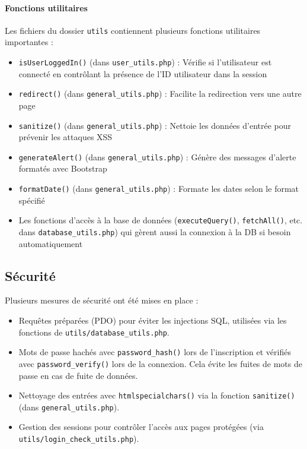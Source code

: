 \documentclass[a4paper,12pt]{article}
\begin{document}
\paragraph{Fonctions utilitaires}
Les fichiers du dossier \texttt{utils} contiennent plusieurs fonctions utilitaires importantes :
\begin{itemize}
    \item \texttt{isUserLoggedIn()} (dans \texttt{user\_utils.php}) : Vérifie si l'utilisateur est connecté en contrôlant la présence de l'ID utilisateur dans la session
    \item \texttt{redirect()} (dans \texttt{general\_utils.php}) : Facilite la redirection vers une autre page
    \item \texttt{sanitize()} (dans \texttt{general\_utils.php}) : Nettoie les données d'entrée pour prévenir les attaques XSS
    \item \texttt{generateAlert()} (dans \texttt{general\_utils.php}) : Génère des messages d'alerte formatés avec Bootstrap
    \item \texttt{formatDate()} (dans \texttt{general\_utils.php}) : Formate les dates selon le format spécifié
    \item Les fonctions d'accès à la base de données (\texttt{executeQuery()}, \texttt{fetchAll()}, etc. dans \texttt{database\_utils.php}) qui gèrent aussi la connexion à la DB si besoin automatiquement
\end{itemize}

\subsection{Sécurité}
Plusieurs mesures de sécurité ont été mises en place :
\begin{itemize}
    \item Requêtes préparées (PDO) pour éviter les injections SQL, utilisées via les fonctions de \texttt{utils/database\_utils.php}.
    \item Mots de passe hachés avec \texttt{password\_hash()} lors de l'inscription et vérifiés avec \texttt{password\_verify()} lors de la connexion. Cela évite les fuites de mots de passe en cas de fuite de données.
    \item Nettoyage des entrées avec \texttt{htmlspecialchars()} via la fonction \texttt{sanitize()} (dans \texttt{general\_utils.php}).
    \item Gestion des sessions pour contrôler l'accès aux pages protégées (via \texttt{utils/login\_check\_utils.php}).
\end{itemize}
\end{document}
